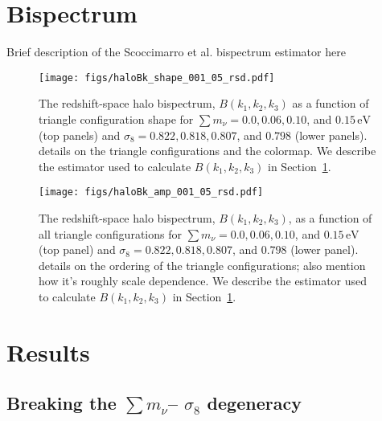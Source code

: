 \documentclass[12pt, letterpaper, preprint]{aastex62}
\newcommand{\smnu}{\sum m_\nu}
\newcommand{\sig}{\sigma_8}
\newcommand{\ch}[1]{{\color{orange}{\bf CH:} #1}}
\begin{document}
\section{Bispectrum} \label{sec:bk} 
Brief description of the Scoccimarro et al. bispectrum estimator here 

\begin{figure}
\begin{center}
    \texttt{[image: figs/haloBk\_shape\_001\_05\_rsd.pdf]} 
    \caption{The redshift-space halo bispectrum, $B(k_1, k_2, k_3)$ as a 
    function of triangle configuration shape for $\smnu = 0.0, 0.06, 0.10$, 
    and $0.15\,\mathrm{eV}$ (top panels) and $\sig = 0.822, 0.818, 0.807$, 
    and $0.798$ (lower panels). 
    \ch{details on the triangle configurations and the colormap}.
    We describe the estimator used to calculate $B(k_1, k_2, k_3)$ in 
    Section~\ref{sec:bk}.}
\label{fig:bk_shape}
\end{center}
\end{figure}

\begin{figure}
\begin{center}
\texttt{[image: figs/haloBk\_amp\_001\_05\_rsd.pdf]}
    \caption{The redshift-space halo bispectrum, $B(k_1, k_2, k_3)$, as a
    function of all triangle configurations for $\smnu = 0.0, 0.06, 0.10$, 
    and $0.15\,\mathrm{eV}$ (top panel) and $\sig = 0.822, 0.818, 0.807$, 
    and $0.798$ (lower panel). 
    \ch{details on the ordering of the triangle configurations; also mention
    how it's roughly scale dependence}.
    We describe the estimator used to calculate $B(k_1, k_2, k_3)$ in 
    Section~\ref{sec:bk}.}
\label{fig:bk_amp}
\end{center}
\end{figure}

\section{Results} \label{sec:results} 
\subsection{Breaking the $\smnu$-- $\sig$ degeneracy}
\end{document}
